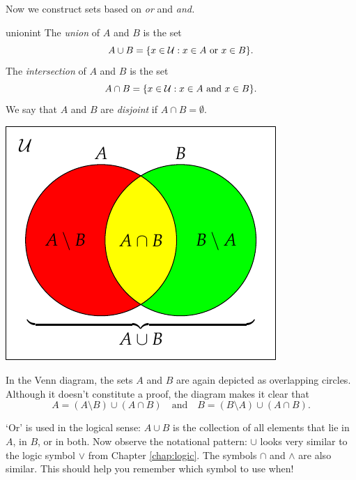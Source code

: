 \begin{minipage}[t]{0.62\linewidth}\vspace{0pt}
Now we construct sets based on \emph{or} and \emph{and.}

\begin{defn}{}{unionint}
The \emph{union} of $A$ and $B$ is the set
\[A\cup B=\{x\in\mathcal{U}:x\in A\text{ or }x\in B\}.\]
The \emph{intersection} of $A$ and $B$ is the set
\[A\cap B=\{x\in\mathcal{U}:x\in A\text{ and }x\in B\}.\]
We say that $A$ and $B$ are \emph{disjoint} if $A\cap B=\emptyset$.
\end{defn}
\end{minipage}\qquad
\begin{minipage}[t]{0.33\linewidth}\vspace{0pt}
\includegraphics[width=\textwidth]{sets-04-vennunion}
\end{minipage}\par

 In the Venn diagram, the sets $A$ and $B$ are again depicted as overlapping circles. Although it doesn't constitute a proof, the diagram makes it clear that
\[A=(A\setminus B)\cup (A\cap B)\quad\text{and}\quad B=(B\setminus A)\cup(A\cap B).\]

`Or' is used in the logical sense: $A\cup B$ is the collection of all elements that lie in $A$, in $B$, or in both.
Now observe the notational pattern: $\cup$ looks very similar to the logic symbol $\vee$ from Chapter \ref{chap:logic}. The symbols $\cap$ and $\wedge$ are also similar. This should help you remember which symbol to use when!


